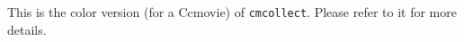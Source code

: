 This is the color version (for a Ccmovie) of \verb+cmcollect+.
Please refer to it for more details.
